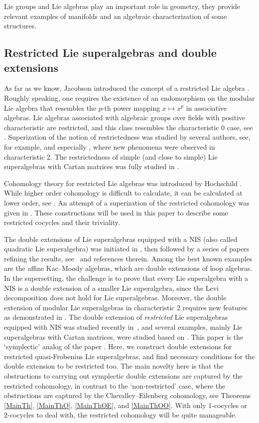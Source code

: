 \documentclass[pdftex]{sigma}
\numberwithin{equation}{section}
\begin{document}
Lie groups and Lie algebras play an important role in geometry, they provide relevant examples of manifolds and an algebraic characterization of some structures.

\subsection{Restricted Lie superalgebras and double extensions}
As far as we know, Jacobson introduced the concept of a restricted Lie algebra
\cite{J}. Roughly speaking, one requires the existence of an endomorphism on the modular
Lie algebra that resembles the $p$-th power mapping $x \mapsto x^p$ in associative algebras. Lie algebras associated with algebraic groups over fields with positive characteristic are restricted, and this class resembles the characteristic 0 case, see \cite{S, SF}. Superization
of the notion of restrictedness was studied by several authors, see, for example, \cite{BKLS, Fa, P,SZ, U,Y, YCC, Z} and especially \cite{BLLS}, where new phenomena were observed in characteristic 2. The restrictedness of simple (and close to simple) Lie superalgebras with Cartan matrices was fully studied in \cite{BKLLS}.

Cohomology theory for restricted Lie algebras was introduced by Hochschild \cite{H}. While higher order cohomology is difficult to calculate, it can be calculated at lower order, see \cite{EF}. An attempt of a superization of the restricted cohomology was given in \cite{YCC}. These constructions will be used in this paper to describe some restricted cocycles and their triviality.

The double extensions of Lie superalgebras equipped with a NIS (also called quadratic Lie superalgebra) was initiated in \cite{BB}, then followed by a series of papers refining the results, see~\cite{B} and references therein. Among the best known examples are the affine Kac--Moody algebras, which are double extensions of loop algebras. In the supersetting, the challenge is to prove that every Lie superalgebra with a NIS is a double extension of a smaller Lie superalgebra, since the Levi decomposition does not hold for Lie superalgebras. Moreover, the double extension of modular Lie superalgebras in characteristic 2 requires new features as demonstrated in \cite{BeBou1, BeBou2}. The double extension of {\it restricted} Lie superalgebras equipped with NIS was studied recently in~\cite{BBH}, and several examples, mainly Lie superalgebras with Cartan matrices, were studied based on \cite{BKLS, BKLLS}. This paper is the `symplectic' analog of the paper \cite{BBH}. Here, we construct double extensions for restricted quasi-Frobenius Lie superalgebras, and find necessary conditions for the double extension to be restricted too. The main novelty here is that the obstructions to carrying out symplectic double extensions are captured by the restricted cohomology, in contrast to the `non-restricted' case, where the obstructions are captured by the Chevalley--Eilenberg cohomology, see Theorems \ref{MainTh}, \ref{MainThO}, \ref{MainThOE}, and \ref{MainThOO}. With only 1-cocycles or 2-cocycles to deal with, the restricted cohomology will be quite manageable.
\end{document}
